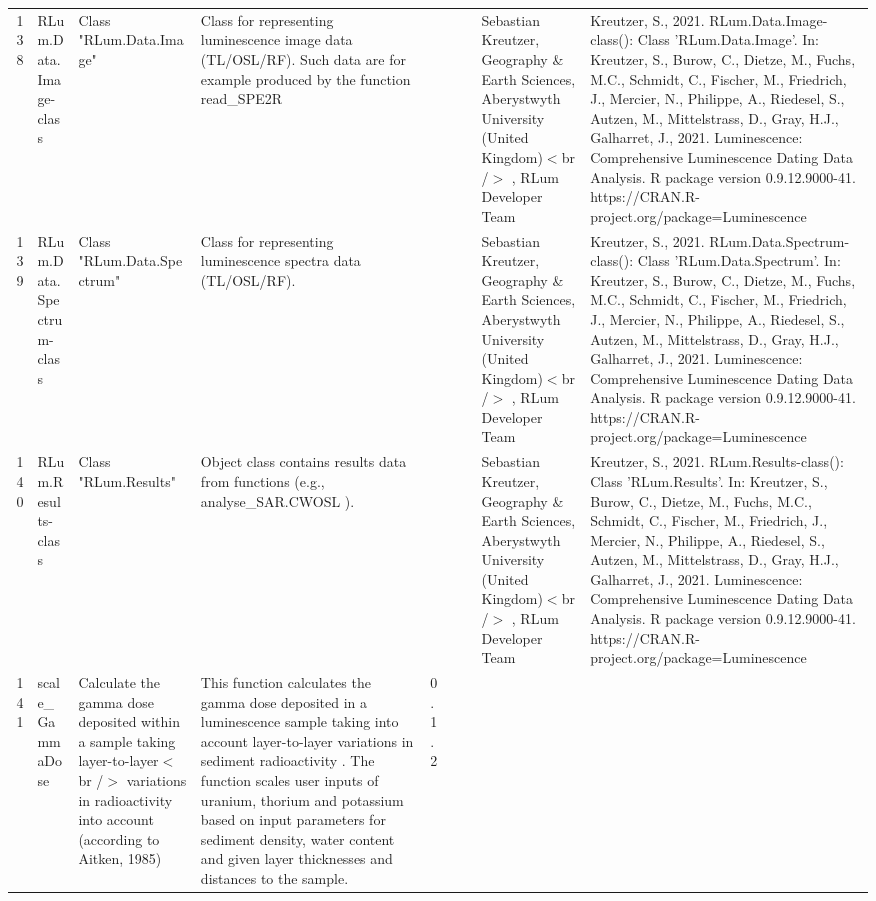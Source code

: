 \begin{table}[ht]
\begin{tabular}{rllllllll}
 \\ 
  138 & RLum.Data.Image-class & Class  "RLum.Data.Image" & Class for representing luminescence image data (TL/OSL/RF). Such data are for example produced by the function  read\_SPE2R &  &  &  & Sebastian Kreutzer, Geography \& Earth Sciences, Aberystwyth University (United Kingdom)$<$br /$>$ , RLum Developer Team & Kreutzer, S., 2021. RLum.Data.Image-class(): Class 'RLum.Data.Image'. In: Kreutzer, S., Burow, C., Dietze, M., Fuchs, M.C., Schmidt, C., Fischer, M., Friedrich, J., Mercier, N., Philippe, A., Riedesel, S., Autzen, M., Mittelstrass, D., Gray, H.J., Galharret, J., 2021. Luminescence: Comprehensive Luminescence Dating Data Analysis. R package version 0.9.12.9000-41. https://CRAN.R-project.org/package=Luminescence
 \\ 
  139 & RLum.Data.Spectrum-class & Class  "RLum.Data.Spectrum" & Class for representing luminescence spectra data (TL/OSL/RF). &  &  &  & Sebastian Kreutzer, Geography \& Earth Sciences, Aberystwyth University (United Kingdom)$<$br /$>$ , RLum Developer Team & Kreutzer, S., 2021. RLum.Data.Spectrum-class(): Class 'RLum.Data.Spectrum'. In: Kreutzer, S., Burow, C., Dietze, M., Fuchs, M.C., Schmidt, C., Fischer, M., Friedrich, J., Mercier, N., Philippe, A., Riedesel, S., Autzen, M., Mittelstrass, D., Gray, H.J., Galharret, J., 2021. Luminescence: Comprehensive Luminescence Dating Data Analysis. R package version 0.9.12.9000-41. https://CRAN.R-project.org/package=Luminescence
 \\ 
  140 & RLum.Results-class & Class  "RLum.Results" & Object class contains results data from functions (e.g.,  analyse\_SAR.CWOSL ). &  &  &  & Sebastian Kreutzer, Geography \& Earth Sciences, Aberystwyth University (United Kingdom)$<$br /$>$ , RLum Developer Team & Kreutzer, S., 2021. RLum.Results-class(): Class 'RLum.Results'. In: Kreutzer, S., Burow, C., Dietze, M., Fuchs, M.C., Schmidt, C., Fischer, M., Friedrich, J., Mercier, N., Philippe, A., Riedesel, S., Autzen, M., Mittelstrass, D., Gray, H.J., Galharret, J., 2021. Luminescence: Comprehensive Luminescence Dating Data Analysis. R package version 0.9.12.9000-41. https://CRAN.R-project.org/package=Luminescence
 \\ 
  141 & scale\_GammaDose & Calculate the gamma dose deposited within a sample taking layer-to-layer$<$br /$>$ variations in radioactivity into account (according to Aitken, 1985) & This function calculates the gamma dose deposited in a luminescence sample taking into account layer-to-layer variations in sediment radioactivity . The function scales user inputs of uranium, thorium and potassium based on input parameters for sediment density, water content and given layer thicknesses and distances to the sample. & 0.1.2

\end{tabular}
\end{table}

